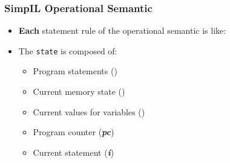 \begin{frame}[noframenumbering]
	\frametitle{SimpIL Operational Semantic}
	\begin{itemize}		
		\item \textbf{Each} statement rule of the operational semantic is like:		
	\end{itemize}		
	\begin{prooftree}		
	\end{prooftree}		
	\begin{itemize}		
		\item The \texttt{state} is composed of: \newline		
	\begin{minipage}{0.5\textwidth}		
		\begin{itemize}		
			\item Program statements (\bm{$\sum$})		
			\item Current memory state (\bm{$\mu$})		
			\item Current values for variables (\bm{$\Delta$})		
		\end{itemize}		
	\end{minipage}		
	\begin{minipage}{0.4\textwidth}		
		\begin{itemize}		
			\item Program counter (\textbf{\textit{pc}})		
			\item Current statement (\textit{\textbf{i}})		
		\end{itemize}		
	\end{minipage}		
\end{itemize}
\end{frame}
